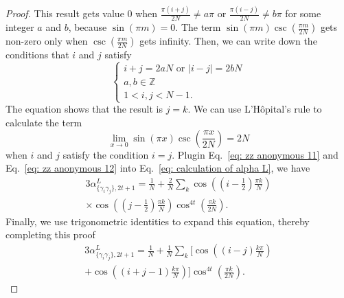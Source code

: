 \documentclass[journal=jctcce,a4paper,manuscript=article]{achemso}
\newcommand{\alpl}{\alpha_{\{\gamma_i\gamma_j\}, 2t+1}^{L}}
\begin{document}
\begin{proof}
  This result gets value $0$ when $\frac{\pi(i+j)}{2 N}\neq a \pi$ or
  $\frac{\pi(i-j)}{2 N}\neq b \pi$ for some integer $a$ and $b$, because
  $\sin(\pi m) = 0$. The term $ \sin(\pi m) \csc(\frac{\pi m}{2N})$ gets non-zero
  only when $\csc(\frac{\pi m}{2N})$ gets infinity. Then, we can write down the
  conditions that $i$ and $j$ satisfy
  \begin{equation}
    \left\{\begin{array}{l}
      i+j=2 a N \text { or } |i-j|=2 b N \\
      a, b \in \mathbb{Z}                \\
      1<i,j<N-1.
    \end{array} \right.
  \end{equation}
  The equation shows that the result is $j=k$. We can use  L'Hôpital's rule to calculate the term
  \begin{equation}
    \label{eq: zz anonymous 11}
    \lim_{x\to 0} \sin(\pi x) \csc(\frac{\pi x}{2N}) = 2N
  \end{equation}
  when $i$ and $j$ satisfy the condition $i=j$. Plugin Eq.~\eqref{eq: zz anonymous 11} and Eq.~\eqref{eq: zz anonymous 12} into Eq.~\eqref{eq: calculation of alpha L}, we have
  \begin{equation}
    \label{eq: zz anonymous 13}
    \begin{aligned}
      3\alpl = \frac{1}{N} + \frac{2}{N} \sum_k \cos \left(\left(i-\frac{1}{2}\right) \frac{\pi k}{N}\right) \\
      \times \cos \left(\left(j-\frac{1}{2}\right) \frac{\pi k}{N}\right)\cos ^{4 t}\left( \frac{\pi k}{2 N} \right).
    \end{aligned}
  \end{equation}
  Finally, we use trigonometric identities to expand this equation, thereby completing this proof
  \begin{equation}
    \begin{aligned}
      3\alpl=\frac{1}{N}+\frac{1}{N} \sum_k\Big[\cos \left((i-j) \frac{k \pi}{N}\right) \\
        +\cos \left((i+j-1) \frac{k \pi}{N}\right)\Big] \cos ^{4 t}\left(\frac{\pi k}{2 N}\right).
    \end{aligned}
  \end{equation}
\end{proof}
\end{document}
